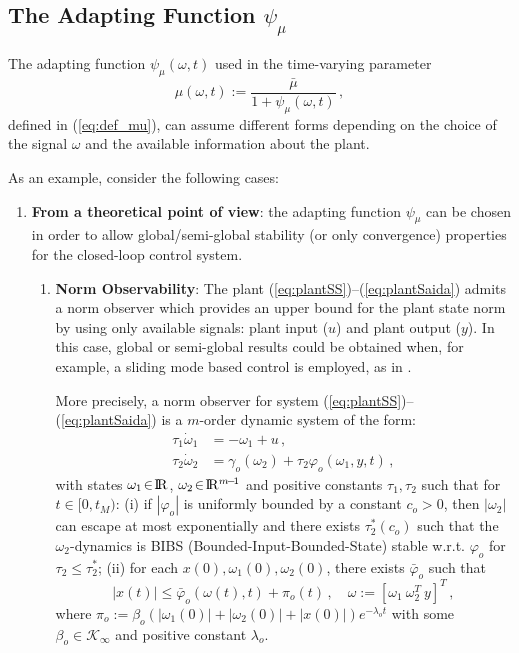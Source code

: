 \documentclass[letterpaper, 10 pt, conference]{ieeeconf}  %
\def\re{{\rm I}\! {\rm R}}
\theoremstyle{plain}
\theoremstyle{definition}
\theoremstyle{remark}
\begin{document}
\subsection{The Adapting Function $\psi_\mu$}

The adapting function $\psi_\mu(\omega,t)$ used in the time-varying parameter 
%
\begin{equation}
\mu(\omega,t):=\frac{\bar{\mu}}{1+
\psi_\mu(\omega,t)}\,,%
\end{equation}
%
defined in (\ref{eq:def_mu}), can assume different forms depending on the choice of the signal $\omega$ and the available information about the plant. 

As an example, consider the following cases:
%
\begin{enumerate}

\item {\bf From a theoretical point of view}: the adapting function $\psi_\mu$ can be chosen in order to allow global/semi-global stability (or only convergence) properties for the closed-loop control system. 

\begin{enumerate}

\item {\bf Norm Observability}: The plant
(\ref{eq:plantSS})--(\ref{eq:plantSaida}) admits a norm observer which provides an upper bound for the plant state norm by using only  available signals: plant input ($u$) and plant output ($y$). In this case, global or semi-global results could be obtained when, for example, a sliding mode based control is employed, as in \cite{POH:2011}.  


More precisely, a norm observer for system
(\ref{eq:plantSS})--(\ref{eq:plantSaida})  is a $m$-order
dynamic system of the form:
%
\begin{align}
\tau_1 \dot{\omega}_1 &= -\omega_1+u\,, \label{eq:defuav} \\
\tau_2 \dot{\omega}_2 &=
\gamma_o(\omega_2)+\tau_2\varphi_o(\omega_1,y,t)\,,\label{eq:normobsgeneric}
\end{align}
%
with states $\omega_1\!\in\!\re$, $\omega_2\!\in\!\re^{m\!-\!1}$ and
positive constants $\tau_1, \tau_2$ such that for $t\in[0,t_M)$: (i)
if $|\varphi_o|$ is uniformly bounded by a constant $c_o\!>\!0$,
then $|\omega_2|$ can escape at most exponentially and there exists
$\tau_2^*(c_o)$ such that the $\omega_2$-dynamics is BIBS
(Bounded-Input-Bounded-State) stable w.r.t. $\varphi_o$ for
$\tau_2\leq \tau_2^*$; (ii)
for each $x(0),\omega_1(0),\omega_2(0)$, there exists $\bar{\varphi}_o$ such that
%
\begin{equation}
|x(t)| \leq \bar{\varphi}_o(\omega(t),t) + \pi_o(t) \,, \quad
\omega:=[\omega_1 \ \omega_2^T \ y]^T\,,\label{eq:xboundfromw}
\end{equation}
%
where
$\pi_o:=\beta_o(|\omega_1(0)|\!+\!|\omega_2(0)|\!+\!|x(0)|)e^{-\lambda_o
t}$ with some $\beta_o \in \mathcal{K}_\infty$ and positive
constant $\lambda_o$.


\end{enumerate}
\end{enumerate}
\end{document}
